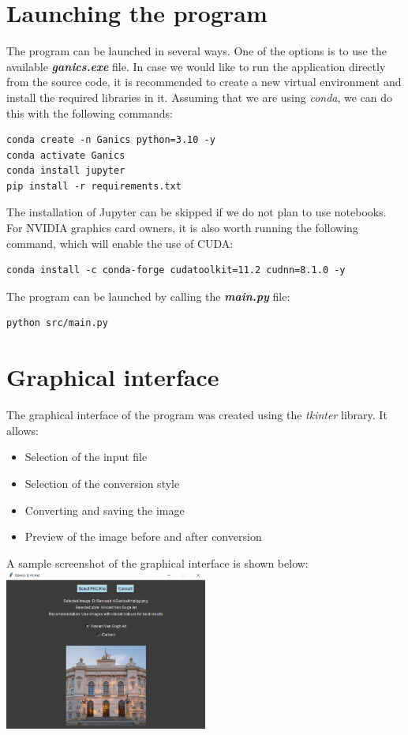 \documentclass{article}
\begin{document}
\section{Launching the program}
The program can be launched in several ways. One of the options is to use the available \textbf{\textit{ganics.exe}} file.
In case we would like to run the application directly from the source code, it is recommended to create a new virtual environment and install the required libraries in it.
Assuming that we are using \textit{conda}, we can do this with the following commands:
\begin{verbatim}
conda create -n Ganics python=3.10 -y
conda activate Ganics
conda install jupyter
pip install -r requirements.txt
\end{verbatim}
The installation of Jupyter can be skipped if we do not plan to use notebooks.
\vspace{3mm} \\
For NVIDIA graphics card owners, it is also worth running the following command, which will enable the use of CUDA:
\begin{verbatim}
conda install -c conda-forge cudatoolkit=11.2 cudnn=8.1.0 -y
\end{verbatim}
The program can be launched by calling the \textbf{\textit{main.py}} file:
\begin{verbatim}
python src/main.py
\end{verbatim}

\section{Graphical interface}
The graphical interface of the program was created using the \textit{tkinter} library. It allows:
\begin{itemize}
    \setlength\itemsep{0pt}
    \item Selection of the input file
    \item Selection of the conversion style
    \item Converting and saving the image
    \item Preview of the image before and after conversion
\end{itemize}
A sample screenshot of the graphical interface is shown below:
\vspace{3mm} \\
\includegraphics[width=0.5\textwidth]{../imgs/gui.png}
\end{document}
